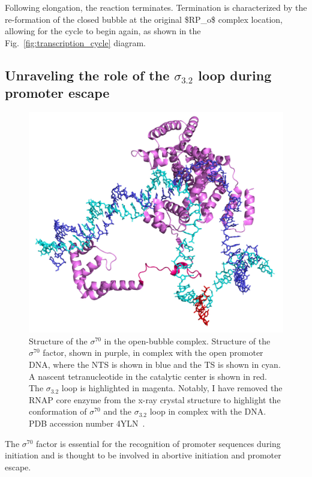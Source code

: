 Following elongation, the reaction terminates.
Termination is characterized by the re-formation of the closed bubble at the original \ac{$RP_o$} complex location, allowing for the cycle to begin again, as shown in the Fig.~\ref{fig:transcription_cycle} diagram.

\subsection{\label{sec:promoter_escape} 
Unraveling the role of the $\sigma_{3.2}$ loop during promoter escape}

\begin{figure}
    \centering
    \includegraphics[width=\textwidth]{chapters/figures/sigma_structure.jpg}
    \caption{\label{fig:sigma_structure} 
    Structure of the $\sigma^{70}$ in the open-bubble complex.
    Structure of the $\sigma^{70}$ factor, shown in purple, in complex with the open promoter DNA, where the \ac{NTS} is shown in blue and the \ac{TS} is shown in cyan.
    A nascent tetranucleotide in the catalytic center is shown in red.
    The $\sigma_{3.2}$ loop is highlighted in magenta.
    Notably, I have removed the RNAP core enzyme from the x-ray crystal structure to highlight the conformation of $\sigma^{70}$ and the $\sigma_{3.2}$ loop in complex with the DNA.
    \ac{PDB} accession number 4YLN~\cite{zuo_steitz_2015}.
    }
\end{figure}

The $\sigma^{70}$ factor is essential for the recognition of promoter sequences during initiation and is thought to be involved in abortive initiation and promoter escape. 

